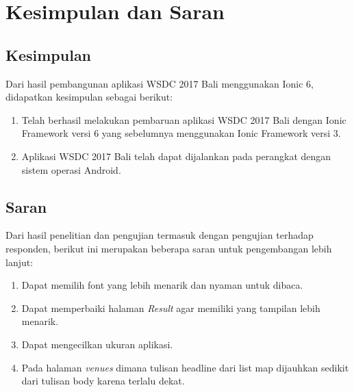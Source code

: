 \chapter{Kesimpulan dan Saran}
\label{chap:kesimpulanSaran}

\section{Kesimpulan} 
\label{sec:kesimpulan}

Dari hasil pembangunan aplikasi WSDC 2017 Bali menggunakan Ionic 6, didapatkan kesimpulan sebagai berikut:

\begin{enumerate}
	\item Telah berhasil melakukan pembaruan aplikasi WSDC 2017 Bali dengan Ionic Framework versi 6 yang sebelumnya menggunakan Ionic Framework versi 3.
	\item Aplikasi WSDC 2017 Bali telah dapat dijalankan pada perangkat dengan sistem operasi Android.
\end{enumerate}

\section{Saran} 
\label{sec:saran}

Dari hasil penelitian dan pengujian termasuk dengan pengujian terhadap responden, berikut ini merupakan beberapa saran untuk pengembangan lebih lanjut:

\begin{enumerate}
	\item Dapat memilih font yang lebih menarik dan nyaman untuk dibaca.
	\item Dapat memperbaiki halaman \textit{Result} agar memiliki yang tampilan lebih menarik.
	\item Dapat mengecilkan ukuran aplikasi.
	\item Pada halaman \textit{venues} dimana tulisan headline dari list map dijauhkan sedikit dari tulisan body karena terlalu dekat.
\end{enumerate}